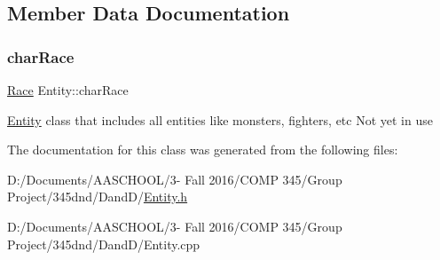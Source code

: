 \subsection{Member Data Documentation}
\hypertarget{class_entity_af1e600508552c74e578dc3258e2175c5}{}\label{class_entity_af1e600508552c74e578dc3258e2175c5} 
\subsubsection{\texorpdfstring{char\+Race}{charRace}}
{\footnotesize\ttfamily \hyperlink{_entity_8h_aa2df4028f474807638d438104900b003}{Race} Entity\+::char\+Race}

\hyperlink{class_entity}{Entity} class that includes all entities like monsters, fighters, etc Not yet in use 

The documentation for this class was generated from the following files\+:\begin{DoxyCompactItemize}
\item 
D\+:/\+Documents/\+A\+A\+S\+C\+H\+O\+O\+L/3-\/ Fall 2016/\+C\+O\+M\+P 345/\+Group Project/345dnd/\+Dand\+D/\hyperlink{_entity_8h}{Entity.\+h}\item 
D\+:/\+Documents/\+A\+A\+S\+C\+H\+O\+O\+L/3-\/ Fall 2016/\+C\+O\+M\+P 345/\+Group Project/345dnd/\+Dand\+D/Entity.\+cpp\end{DoxyCompactItemize}
